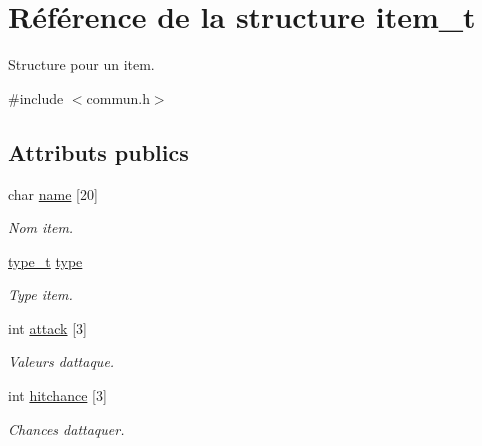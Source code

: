\hypertarget{structitem__t}{}\section{Référence de la structure item\+\_\+t}
\label{structitem__t}


Structure pour un item.  




{\ttfamily \#include $<$commun.\+h$>$}

\subsection*{Attributs publics}
\begin{DoxyCompactItemize}
\item 
\mbox{\label{structitem__t_a6b58ae897170ec1a60a5e9ec1467abc3}} 
char \hyperlink{structitem__t_a6b58ae897170ec1a60a5e9ec1467abc3}{name} \mbox{[}20\mbox{]}
\begin{DoxyCompactList}\small\item\em Nom item. \end{DoxyCompactList}\item 
\mbox{\label{structitem__t_a6fac989fb0653fe343f3b6b7e86d9d4d}} 
\hyperlink{commun_8h_adee610a3c7375031538811d29f6a4124}{type\+\_\+t} \hyperlink{structitem__t_a6fac989fb0653fe343f3b6b7e86d9d4d}{type}
\begin{DoxyCompactList}\small\item\em Type item. \end{DoxyCompactList}\item 
\mbox{\label{structitem__t_a67d3c9d562d3ace7d0ef346ea8b1dec1}} 
int \hyperlink{structitem__t_a67d3c9d562d3ace7d0ef346ea8b1dec1}{attack} \mbox{[}3\mbox{]}
\begin{DoxyCompactList}\small\item\em Valeurs d\textquotesingle{}attaque. \end{DoxyCompactList}\item 
\mbox{\label{structitem__t_a362b9c973dc78077d57ca030dfd16493}} 
int \hyperlink{structitem__t_a362b9c973dc78077d57ca030dfd16493}{hitchance} \mbox{[}3\mbox{]}
\begin{DoxyCompactList}\small\item\em Chances d\textquotesingle{}attaquer. \end{DoxyCompactList}\item 

\end{DoxyCompactItemize}

